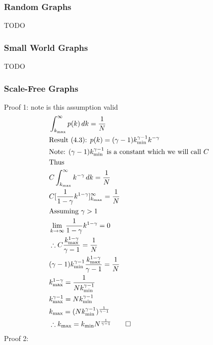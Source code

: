 \documentclass{article}
\begin{document}
            \subsubsection{Random Graphs}
            TODO
            \subsubsection{Small World Graphs}
            TODO
            \subsubsection{Scale-Free Graphs}
            Proof 1: note is this assumption valid
            \begin{align*}
                &\int_{k_{\text{max}}}^{\infty} p(k) \,dk = \frac{1}{N}\\
                &\text{Result (4.3): } p(k) = (\gamma -1)k^{\gamma-1}_{\text{min}}k^{-\gamma}\\
                &\text{Note: $(\gamma -1)k^{\gamma-1}_{\text{min}}$ is a constant which we will call $C$}\\
                &\text{Thus}\\
                &C\int_{k_{\text{max}}}^{\infty}k^{-\gamma} \,dk  = \frac{1}{N}\\
                &C[\frac{1}{1-\gamma}k^{1-\gamma}]^{\infty}_{k_{\text{max}}} = \frac{1}{N}\\
                &\text{Assuming $\gamma>1$}\\
                &\lim_{k \to \infty} \frac{1}{1-\gamma}k^{1-\gamma}= 0\\
                &\therefore C\frac{{k^{1-\gamma}_{\text{max}}}}{\gamma -1} = \frac{1}{N}\\
                &(\gamma-1)k^{\gamma-1}_{\text{min}}\frac{{k^{1-\gamma}_{\text{max}}}}{\gamma -1} = \frac{1}{N}\\
                &k^{1-\gamma}_{\text{max}} = \frac{1}{Nk^{\gamma-1}_{\text{min}}}\\
                &k^{\gamma -1}_{\text{max}} = Nk^{\gamma-1}_{\text{min}}\\
                &k_{\text{max}} = (Nk^{\gamma-1}_{\text{min}})^{\frac{1}{\gamma-1}}\\
                &\therefore k_{\text{max}} = k_{\text{min}}N^{\frac{1}{\gamma-1}} \qed
            \end{align*}
            Proof 2:
\end{document}
